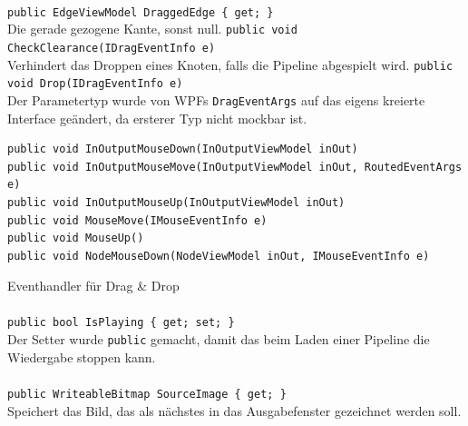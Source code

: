 \paragraph{}
\begin{itemize}
	\add \verb!public EdgeViewModel DraggedEdge { get; }! \\
	Die gerade gezogene Kante, sonst null.
	\add \verb!public void CheckClearance(IDragEventInfo e)! \\
	Verhindert das Droppen eines Knoten, falls die Pipeline abgespielt wird.
	\change \verb!public void Drop(IDragEventInfo e)! \\
	Der Parametertyp wurde von WPFs \verb!DragEventArgs! auf das eigens kreierte Interface  geändert, da ersterer Typ nicht mockbar ist.
	\add \begin{verbatim}
public void InOutputMouseDown(InOutputViewModel inOut)
public void InOutputMouseMove(InOutputViewModel inOut, RoutedEventArgs e)
public void InOutputMouseUp(InOutputViewModel inOut)
public void MouseMove(IMouseEventInfo e)
public void MouseUp()
public void NodeMouseDown(NodeViewModel inOut, IMouseEventInfo e)
	\end{verbatim}
	Eventhandler für Drag \& Drop
\end{itemize}

\paragraph{}
\begin{itemize}
	\change \verb!public bool IsPlaying { get; set; }! \\
	Der Setter wurde \verb!public! gemacht, damit das  beim Laden einer Pipeline die Wiedergabe stoppen kann.
\end{itemize}

\paragraph{}
\begin{itemize}
	\add \verb!public WriteableBitmap SourceImage { get; }! \\
	Speichert das Bild, das als nächstes in das Ausgabefenster gezeichnet werden soll.
\end{itemize}
\newpage

